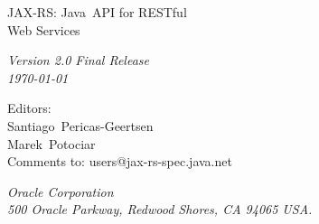 \begin{titlepage}
\raggedleft

\vspace*{60pt}

{\Huge
\textsf{JAX-RS: Java\texttrademark\ API for RESTful\\\vspace{10pt}
 Web Services}}

\vspace{20pt}

{
\Large\textit{Version 2.0 Final Release\\
\today}
}

\vspace{40pt}

{\large Editors:\\
Santiago\ Pericas-Geertsen\\
Marek\ Potociar\\
\vspace{10pt}Comments to: users@jax-rs-spec.java.net
}

\vspace{80pt}

{\small\textit{Oracle Corporation\\
500 Oracle Parkway, Redwood Shores, CA 94065 USA.}
}
\end{titlepage} 
